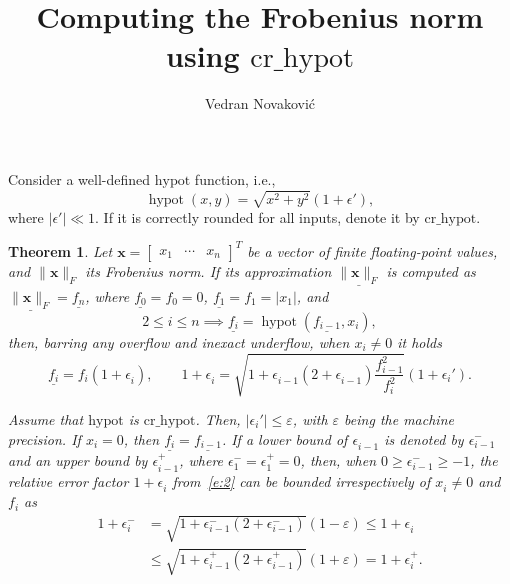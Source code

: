 \documentclass[a4paper,12pt,twoside]{article}
\title{Computing the Frobenius norm using $\mathrm{cr\_hypot}$}
\author{Vedran Novakovi\'{c}}
\newtheorem{thm}{Theorem}
\begin{document}
\maketitle

Consider a well-defined $\mathrm{hypot}$ function, i.e.,
\begin{displaymath}
  \mathop{\mathrm{hypot}}(x,y)=\sqrt{x^2+y^2}(1+\epsilon'),
\end{displaymath}
where $|\epsilon'|\ll 1$.  If it is correctly rounded for all inputs,
denote it by $\mathrm{cr\_hypot}$.

\begin{thm}\label{t:1}
  Let $\mathbf{x}=\begin{bmatrix}x_1&\cdots&x_n\end{bmatrix}^T$ be a
  vector of finite floating-point values, and $\|\mathbf{x}\|_F$ its
  Frobenius norm.  If its approximation $\underline{\|\mathbf{x}\|_F}$
  is computed as $\underline{\|\mathbf{x}\|_F}=\underline{f_n}$, where
  $\underline{f_0}=f_0=0$, $\underline{f_1}=f_1=|x_1|$, and
  \begin{equation}
    2\le i\le n\implies\underline{f_i}=\mathop{\mathrm{hypot}}(\underline{f_{i-1}},x_i),
    \label{e:1}
  \end{equation}
  then, barring any overflow and inexact underflow, when $x_i\ne 0$ it
  holds
  \begin{equation}
    \underline{f_i^{}}=f_i^{}(1+\epsilon_i^{}),\qquad
    1+\epsilon_i^{}=\sqrt{1+\epsilon_{i-1}^{}(2+\epsilon_{i-1}^{})\frac{f_{i-1}^2}{f_i^2}}(1+\epsilon_i').
    \label{e:2}
  \end{equation}

  Assume that $\mathrm{hypot}$ is $\mathrm{cr\_hypot}$.  Then,
  $|\epsilon_i'|\le\varepsilon$, with $\varepsilon$ being the machine
  precision.  If $x_i=0$, then $\underline{f_i}=\underline{f_{i-1}}$.
  If a lower bound of $\epsilon_{i-1}^{}$ is denoted by
  $\epsilon_{i-1}^-$ and an upper bound by $\epsilon_{i-1}^+$, where
  $\epsilon_1^-=\epsilon_1^+=0$, then, when
  $0\ge\epsilon_{i-1}^-\ge-1$, the relative error factor
  $1+\epsilon_i^{}$ from~\eqref{e:2} can be bounded irrespectively of
  $x_i^{}\ne 0$ and $f_i^{}$ as
  \begin{equation}
    \begin{aligned}
      1+\epsilon_i^-&=\sqrt{1+\epsilon_{i-1}^-(2+\epsilon_{i-1}^-)}(1-\varepsilon)\le 1+\epsilon_i^{}\\
      &\le\sqrt{1+\epsilon_{i-1}^+(2+\epsilon_{i-1}^+)}(1+\varepsilon)=1+\epsilon_i^+.
    \end{aligned}
    \label{e:3}
  \end{equation}
\end{thm}
\end{document}
